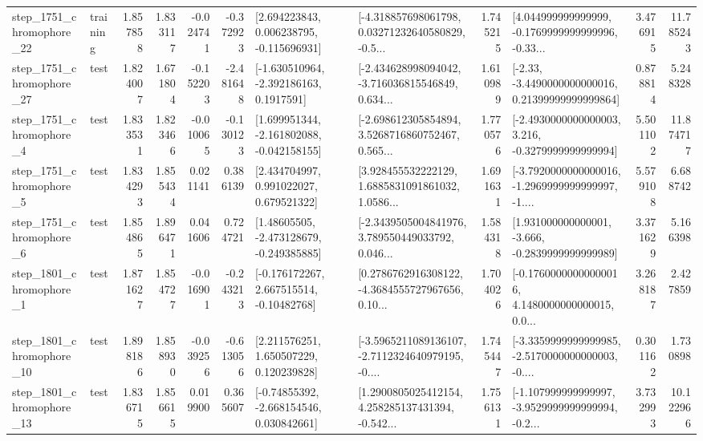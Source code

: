 \begin{tabular}{llrrrrllrlrr}
 step\_1751\_chromophore\_22 &  training &      1.857858 &    1.833117 &     -0.024741 & -0.372923 &    [2.694223843, 0.006238795, -0.115696931] &  [-4.318857698061798, 0.03271232640580829, -0.5... &       1.745215 &  [4.044999999999999, -0.1769999999999996, -0.33... &            3.476915 &         11.785243 \\
 step\_1751\_chromophore\_27 &      test &      1.824007 &    1.671804 &     -0.152203 & -2.481648 &     [-1.630510964, -2.392186163, 0.1917591] &  [-2.434628998094042, -3.716036815546849, 0.634... &       1.610989 &  [-2.33, -3.4490000000000016, 0.21399999999999864] &            0.878814 &          5.248328 \\
  step\_1751\_chromophore\_4 &      test &      1.833531 &    1.823466 &     -0.010065 & -0.130123 &   [1.699951344, -2.161802088, -0.042158155] &  [-2.698612305854894, 3.5268716860752467, 0.565... &       1.770576 &  [-2.4930000000000003, 3.216, -0.3279999999999994] &            5.501102 &         11.874717 \\
  step\_1751\_chromophore\_5 &      test &      1.834293 &    1.855434 &      0.021141 &  0.386139 &     [2.434704997, 0.991022027, 0.679521322] &  [3.928455532222129, 1.6885831091861032, 1.0586... &       1.691631 &  [-3.7920000000000016, -1.2969999999999997, -1.... &            5.579108 &          6.688742 \\
  step\_1751\_chromophore\_6 &      test &      1.854865 &    1.896471 &      0.041606 &  0.724721 &    [1.48605505, -2.473128679, -0.249385885] &  [-2.3439505004841976, 3.789550449033792, 0.046... &       1.584318 &   [1.931000000000001, -3.666, -0.2839999999999989] &            3.371629 &          5.166398 \\
  step\_1801\_chromophore\_1 &      test &      1.871627 &    1.854727 &     -0.016901 & -0.243213 &    [-0.176172267, 2.667515514, -0.10482768] &  [0.2786762916308122, -4.3684555727967656, 0.10... &       1.704026 &  [-0.17600000000000016, 4.1480000000000015, 0.0... &            3.268187 &          2.427859 \\
 step\_1801\_chromophore\_10 &      test &      1.898186 &    1.858930 &     -0.039256 & -0.613056 &     [2.211576251, 1.650507229, 0.120239828] &  [-3.5965211089136107, -2.7112324640979195, -0.... &       1.745447 &  [-3.3359999999999985, -2.5170000000000003, -0.... &            0.301162 &          1.730898 \\
 step\_1801\_chromophore\_13 &      test &      1.836715 &    1.856615 &      0.019900 &  0.365607 &    [-0.74855392, -2.668154546, 0.030842661] &  [1.2900805025412154, 4.258285137431394, -0.542... &       1.756131 &  [-1.107999999999997, -3.9529999999999994, -0.2... &            3.732993 &         10.122966 \\

\end{tabular}

